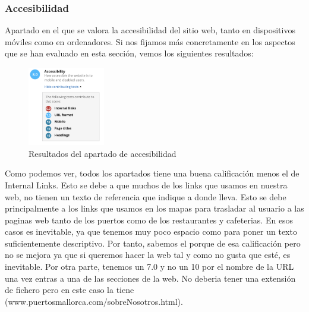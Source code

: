 \documentclass{article}
\begin{document}
\subsubsection{Accesibilidad}
Apartado en el que se valora la accesibilidad del sitio web, tanto en dispositivos móviles como en ordenadores. Si nos fijamos más concretamente en los aspectos que se han evaluado en esta sección, vemos los siguientes resultados:
\begin{figure}[ht]
    \centering
    \includegraphics[width=0.3\textwidth]{images/accesibilidad.png}
    \caption{Resultados del apartado de accesibilidad}
\end{figure}
Como podemos ver, todos los apartados tiene una buena calificación menos el de Internal Links. Esto se debe a que muchos de los links que usamos en nuestra web, no tienen un texto de referencia que indique a donde lleva. Esto se debe principalmente a los links que usamos en los mapas para trasladar al usuario a las paginas web tanto de los puertos como de los restaurantes y cafeterias. En esos casos es inevitable, ya que tenemos muy poco espacio como para poner un texto suficientemente descriptivo. Por tanto, sabemos el porque de esa calificación pero no se mejora ya que si queremos hacer la web tal y como no gusta que esté, es inevitable. Por otra parte, tenemos un 7.0 y no un 10 por el nombre de la URL una vez entras a una de las secciones de la web. No deberia tener una extensión de fichero pero en este caso la tiene (www.puertosmallorca.com/sobreNosotros.html).
\end{document}
